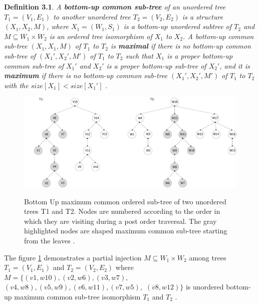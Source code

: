 \documentclass{report}
\begin{document}
\textbf{Definition 3.1}. \emph{
A \textbf{bottom-up common sub-tree} of an unordered tree $ T_{1} = ( V_{1}, E_{1})$ to another unordered tree $ T_{2} = ( V_{2}, E_{2})$ is a structure 
$ (X_{1}, X_{2}, M)$, where $ X_{1} = (W_{1}, S_{1})$ is a bottom-up unordered subtree of $ T_{2}$ and $M \subseteq W_{1} \times  W_{2}$ is an ordered tree isomorphism of $ X_{1}$ to $ X_{2}$. A bottom-up common sub-tree $ (X_{1}, X_{1}, M)$ of $ T_{1}$ to $ T_{2}$ is \textbf{maximal} if there is no bottom-up common sub-tree of $ (X_{1}', X_{2}', M')$ of $ T_{1}$ to $ T_{2}$ such that $ X_{1}$  is a proper bottom-up common sub-tree of $ X_{1}'$ and $ X_{2}'$ is a proper bottom-up sub-tree of $ X_{2}'$, and it is \textbf{maximum} if there is no bottom-up common sub-tree $ (X_{1}', X_{2}', M')$  of $ T_{1}$ to $ T_{2}$ with the $size[X_{1}] < size[X_{1}']$} \cite{valiente}.


\begin{figure}[th]
  \centering
  \includegraphics[scale=0.45]{Figures/algorithms/BU/bottom-up-max-common-example.pdf}\\[0.1cm]
  \caption[Bottom up maximum common sub-tree of two unordered trees]{Bottom Up maximum common ordered sub-tree of two unordered trees T1 and T2. Nodes are numbered according to the order in which they are visiting during a post order traversal. The gray highlighted nodes are shaped maximum common sub-tree starting from the leaves \cite{valiente}.}
  \label{fig:bottom-up-max-common-example}
\end{figure}

The figure \ref{fig:bottom-up-max-common-example} demonstrates a partial injection $M \subseteq W_{1} \times  W_{2}$ among trees $ T_{1} = ( V_{1}, E_{1})$ and  $ T_{2} = ( V_{2}, E_{2})$ where $M  = \{ (v1,w10),  (v2,w6), (v3,w7), $ \\
$(v4,w8),  (v5,w9),  (v6,w11),  (v7,w5), $  $ (v8,w12)\}$ is unordered bottom-up maximum common sub-tree isomorphism $ T_{1}$ and $ T_{2 }$ \cite{valiente}.
\end{document}
